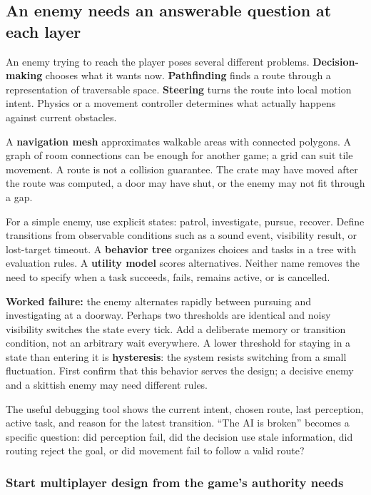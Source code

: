 \subsection{An enemy needs an answerable question at each layer}\label{06-engine-ii-ch040-an-enemy-needs-an-answerable-question-at-each-layer}

An enemy trying to reach the player poses several different problems. \textbf{Decision-making} chooses what it wants now. \textbf{Pathfinding} finds a route through a representation of traversable space. \textbf{Steering} turns the route into local motion intent. Physics or a movement controller determines what actually happens against current obstacles.

A \textbf{navigation mesh} approximates walkable areas with connected polygons. A graph of room connections can be enough for another game; a grid can suit tile movement. A route is not a collision guarantee. The crate may have moved after the route was computed, a door may have shut, or the enemy may not fit through a gap.

For a simple enemy, use explicit states: patrol, investigate, pursue, recover. Define transitions from observable conditions such as a sound event, visibility result, or lost-target timeout. A \textbf{behavior tree} organizes choices and tasks in a tree with evaluation rules. A \textbf{utility model} scores alternatives. Neither name removes the need to specify when a task succeeds, fails, remains active, or is cancelled.

\textbf{Worked failure:} the enemy alternates rapidly between pursuing and investigating at a doorway. Perhaps two thresholds are identical and noisy visibility switches the state every tick. Add a deliberate memory or transition condition, not an arbitrary wait everywhere. A lower threshold for staying in a state than entering it is \textbf{hysteresis}: the system resists switching from a small fluctuation. First confirm that this behavior serves the design; a decisive enemy and a skittish enemy may need different rules.

The useful debugging tool shows the current intent, chosen route, last perception, active task, and reason for the latest transition. ``The AI is broken'' becomes a specific question: did perception fail, did the decision use stale information, did routing reject the goal, or did movement fail to follow a valid route?

\subsubsection{Start multiplayer design from the game's authority needs}\label{06-engine-ii-ch040-start-multiplayer-design-from-the-games-authority-needs}

